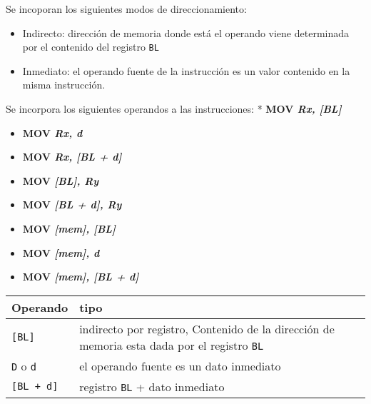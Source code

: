 \documentclass[12pt,twoside]{templates/unerthesis}
\begin{document}
Se incoporan los siguientes modos de direccionamiento:

\begin{itemize}
\item
  Indirecto: dirección de memoria donde está el operando viene determinada por el contenido del registro \texttt{BL}
\item
  Inmediato: el operando fuente de la instrucción es un valor contenido en la misma instrucción.
\end{itemize}

Se incorpora los siguientes operandos a las instrucciones:
* \textbf{MOV \emph{Rx, {[}BL{]}}}

\begin{itemize}
\item
  \textbf{MOV \emph{Rx, d}}
\item
  \textbf{MOV \emph{Rx, {[}BL + d{]}}}
\item
  \textbf{MOV \emph{{[}BL{]}, Ry}}
\item
  \textbf{MOV \emph{{[}BL + d{]}, Ry}}
\item
  \textbf{MOV \emph{{[}mem{]}, {[}BL{]}}}
\item
  \textbf{MOV \emph{{[}mem{]}, d}}
\item
  \textbf{MOV \emph{{[}mem{]}, {[}BL + d{]}}}
\end{itemize}

\begin{longtable}[]{@{}ll@{}}
\toprule
\begin{minipage}[b]{0.47\columnwidth}\raggedright
Operando\strut
\end{minipage} & \begin{minipage}[b]{0.47\columnwidth}\raggedright
tipo\strut
\end{minipage}\tabularnewline
\midrule
\endhead
\begin{minipage}[t]{0.47\columnwidth}\raggedright
\texttt{{[}BL{]}}\strut
\end{minipage} & \begin{minipage}[t]{0.47\columnwidth}\raggedright
indirecto por registro, Contenido de la dirección de memoria esta dada por el registro \texttt{BL}\strut
\end{minipage}\tabularnewline
\begin{minipage}[t]{0.47\columnwidth}\raggedright
\texttt{D} o \texttt{d}\strut
\end{minipage} & \begin{minipage}[t]{0.47\columnwidth}\raggedright
el operando fuente es un dato inmediato\strut
\end{minipage}\tabularnewline
\begin{minipage}[t]{0.47\columnwidth}\raggedright
\texttt{{[}BL\ +\ d{]}}\strut
\end{minipage} & \begin{minipage}[t]{0.47\columnwidth}\raggedright
registro \texttt{BL} + dato inmediato\strut
\end{minipage}\tabularnewline
\bottomrule
\end{longtable}
\end{document}
